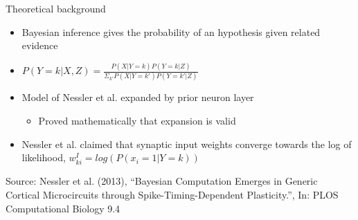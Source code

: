 \documentclass[aspectratio=169]{beamer}
\begin{document}
\begin{frame}{Theoretical background}
\vspace{-1.0cm}
      \begin{itemize}
        \item Bayesian inference gives the probability of an hypothesis given related evidence
        \item $P(Y = k|X, Z) = \frac{P(X|Y=k)P(Y = k|Z)}{\Sigma_{k'}P(X|Y=k')P(Y=k'|Z)}$
        \item Model of Nessler et al. expanded by prior neuron layer
          \begin{itemize}
            \item Proved mathematically that expansion is valid
          \end{itemize}
        \item Nessler et al. claimed that synaptic input weights converge towards the log of likelihood, $w^{I}_{ki} = log(P(x_i = 1 | Y = k))$
        \end{itemize}
   \scriptsize Source: Nessler et al. (2013), “Bayesian Computation Emerges in
 Generic Cortical Microcircuits through Spike-Timing-Dependent Plasticity.”, In: PLOS Computational Biology 9.4
\end{frame}
\end{document}

